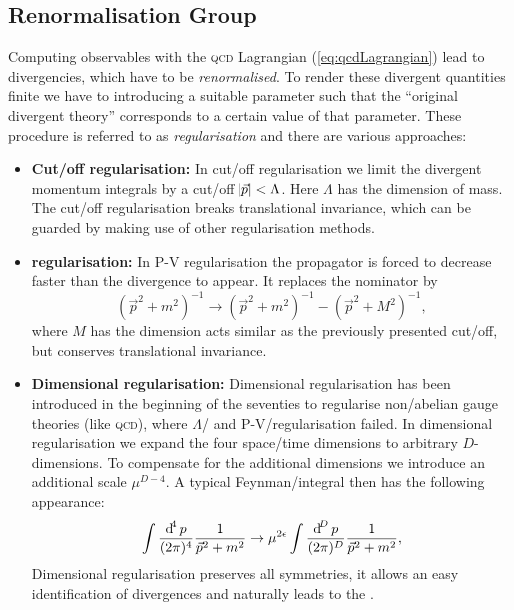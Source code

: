 \documentclass[../../index.tex]{subfiles}
\begin{document}
\subsection{Renormalisation Group}
Computing observables with the \textsc{qcd} Lagrangian (\cref{eq:qcdLagrangian})
lead to divergencies, which have to be \textit{renormalised}. To render these
divergent quantities finite we have to introducing a suitable parameter such
that the ``original divergent theory'' corresponds to a certain value of that
parameter. These procedure is referred to as \textit{regularisation} and there
are various approaches:
\begin{itemize}
\item \label{itm:lambdaRegularisation}\textbf{Cut\-/off regularisation:} In
  cut\-/off regularisation we limit the divergent momentum integrals by a
  cut\-/off $\abs{\vec p} < \Lambda$. Here $\Lambda$ has the dimension of mass.
  The cut\-/off regularisation breaks translational invariance, which can be
  guarded by making use of other regularisation methods.
\item \textbf{ regularisation:} \cite{Pauli1949} In
  \textsc{P-V} regularisation the propagator is forced to decrease faster than
  the divergence to appear. It replaces the nominator by
  \begin{equation}
    (\vec p^2 + m^2)^{-1} \to (\vec p^2 + m^2)^{-1} - (\vec p^2 + M^2)^{-1},
  \end{equation}
  where $M$ has the dimension acts similar as the previously presented
  cut\-/off, but conserves translational invariance.
\item \textbf{Dimensional regularisation:}
  \cite{Bollini1972,tHooft1972,tHooft1973} Dimensional regularisation has been
  introduced in the beginning of the seventies to regularise non\-/abelian gauge
  theories (like \textsc{qcd}), where $\Lambda$\-/ and
  \textsc{P-V}\-/regularisation failed. In dimensional regularisation we expand
  the four space\-/time dimensions to arbitrary $D$-dimensions. To compensate
  for the additional dimensions we introduce an additional scale $\mu^{D-4}$. A
  typical Feynman\-/integral then has the following appearance:
  \begin{equation}
    \label{eq:dimRegFeynmanIntegral}
    \int \fdif{p} \frac{1}{\vec p^2 + m^2} \to \mu^{2\epsilon} \int \frac{\dif^D p}{(2\pi)^D}\frac{1}{\vec p^2+m^2},
  \end{equation}
  Dimensional regularisation preserves all symmetries, it allows an easy
  identification of divergences and naturally leads to the  \cite{tHooft1973,Weinberg1973a}.
\end{itemize}
\end{document}
